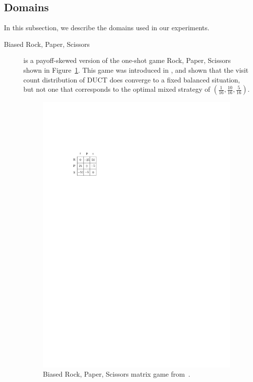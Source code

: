 
\subsection{Domains}

In this subsection, we describe the domains used in our experiments.

\begin{description}
\item[Biased Rock, Paper, Scissors] is a payoff-skewed version of the one-shot game Rock, Paper, Scissors shown in 
Figure~\ref{fig:brps}. This game was introduced in \cite{Shafiei09}, and shown that the visit count distribution of 
DUCT does converge to a fixed balanced situation, but not one that 
corresponds to the optimal mixed strategy of $(\frac{1}{16},\frac{10}{16},\frac{5}{16})$. 

\begin{figure}[h!]
\begin{center}
\includegraphics[scale=1.0]{figures/biased-rps}
\end{center}
\caption{Biased Rock, Paper, Scissors matrix game from~\cite{Shafiei09}. \label{fig:brps}}
\end{figure}


\end{description}
